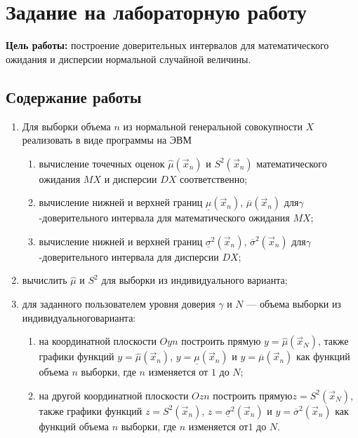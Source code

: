 \chapter{Задание на лабораторную работу}

\textbf{Цель работы:} построение доверительных интервалов для математического ожидания и дисперсии нормальной случайной величины.

\section{Содержание работы}

\begin{enumerate}
    \item Для выборки объема $n$ из нормальной генеральной совокупности $X$ реализовать в виде программы на ЭВМ

    \begin{enumerate}
        \item вычисление точечных оценок $\hat\mu(\vec x_n)$ и $S^2(\vec x_n)$ математического ожидания $MX$ и дисперсии $DX$ соответственно;
        \item вычисление нижней и верхней границ $\underline\mu(\vec x_n)$, $\overline\mu(\vec x_n)$  для\newline$\gamma$-доверительного интервала для математического ожидания $MX$;
        \item вычисление нижней и верхней границ $\underline\sigma^2(\vec x_n)$, $\overline\sigma^2(\vec x_n)$  для\newline$\gamma$-доверительного интервала для дисперсии $DX$;
    \end{enumerate}

    \item вычислить $\hat\mu$ и $S^2$ для выборки из индивидуального варианта;

    \item для заданного пользователем уровня доверия $\gamma$ и $N$ --- объема выборки из индивидуальноговарианта:

    \begin{enumerate}
        \item на координатной плоскости $Oyn$ построить прямую $y = \hat\mu(\vec x_N)$, также графики функций $y = \hat\mu(\vec x_n)$, $y = \underline\mu(\vec x_n)$ и $y = \overline\mu(\vec x_n)$ как функций объема $n$ выборки, где $n$ изменяется от $1$ до $N$;
        \item на другой координатной плоскости $Ozn$ построить прямую\newline$z = S^2(\vec x_N)$, также графики функций $z = S^2(\vec x_n)$, $z = \underline\sigma^2(\vec x_n)$ и $y = \overline\sigma^2(\vec x_n)$ как функций объема $n$ выборки, где $n$ изменяется от\newline$1$ до $N$.
    \end{enumerate}
\end{enumerate}


